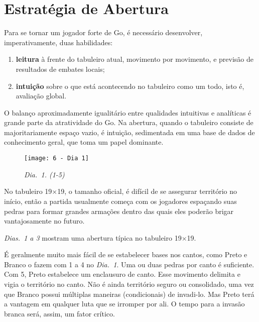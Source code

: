 \chapter{Estratégia de Abertura}\label{chap:6:estrat_abertura}

Para se tornar um jogador forte de Go, é necessário desenvolver, imperativamente, duas habilidades:

\vspace{.25cm}

\begin{enumerate}[leftmargin=1.5cm,rightmargin=1cm]
    \item \textbf{leitura} à frente do tabuleiro atual, movimento por movimento, e previsão de resultados de embates locais;
    \item \textbf{intuição} sobre o que está acontecendo no tabuleiro como um todo, isto é, avaliação global.
\end{enumerate}

\vspace{.25cm}

O balanço aproximadamente igualitário entre qualidades intuitivas e analíticas é grande parte da atratividade do Go. Na abertura, quando o tabuleiro consiste de majoritariamente espaço vazio, é intuição, sedimentada em uma base de dados de conhecimento geral, que toma um papel dominante.

\begin{wrapfigure}{r}{60mm}
    \vspace{-30pt}
    \begin{center}
        \texttt{[image: 6 - Dia 1]}
        \captionsetup{justification=centering}
        \caption*{\emph{Dia.\@~1. (1-5)}}
    \end{center}
    \vspace{-20pt}
\end{wrapfigure}

No tabuleiro 19$\times$19, o tamanho oficial, é difícil de se assegurar território no início, então a partida usualmente começa com os jogadores espaçando suas pedras para formar grandes armações dentro das quais eles poderão brigar vantajosamente no futuro.

\emph{Dias.\@~1 a 3} mostram uma abertura típica no tabuleiro 19$\times$19.

É geralmente muito mais fácil de se estabelecer bases nos cantos, como Preto e Branco o fazem com 1 a 4 no \emph{Dia.\@~1}. Uma ou duas pedras por canto é suficiente. Com 5, Preto estabelece um enclausuro de canto. Esse movimento delimita e vigia o território no canto. Não é ainda território seguro ou consolidado, uma vez que Branco possui múltiplas maneiras (condicionais) de invadi-lo. Mas Preto terá a vantagem em qualquer luta que se irromper por ali. O tempo para a invasão branca será, assim, um fator crítico.

